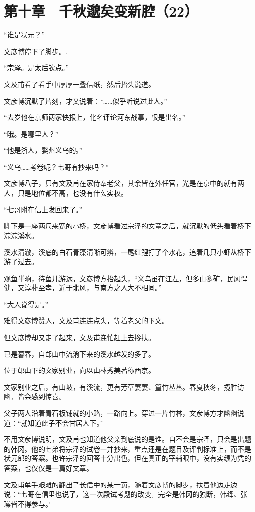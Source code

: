 \section{第十章　千秋邈矣变新腔（22）}

“谁是状元？”

文彦博停下了脚步。.

“宗泽。是太后钦点。”

文及甫看了看手中厚厚一叠信纸，然后抬头说道。

文彦博沉默了片刻，才又说着：“……似乎听说过此人。”

“去岁他在京师两家快报上，化名评论河东战事，很是出名。”

“哦。是哪里人？”

“他是浙人，婺州义乌的。”

“义乌……考卷呢？七哥有抄来吗？”

文彦博八子，只有文及甫在家侍奉老父，其余皆在外任官，光是在京中的就有两人，只是地位都不高，也没有什么实权。

“七哥附在信上发回来了。”

脚下是一座两尺来宽的小桥，文彦博看过宗泽的文章之后，就沉默的低头看着桥下淙淙溪水。

溪水清澈，溪底的白石青藻清晰可辨，一尾红鲤打了个水花，追着几只小虾从桥下游了过去。

观鱼半晌，待鱼儿游远，文彦博方抬起头，“义乌虽在江左，但多山多矿，民风悍健，又淳朴至孝，近于北风，与南方之人大不相同。”

“大人说得是。”

难得文彦博赞人，文及甫连连点头，等着老父的下文。

但文彦博却又走了起来，文及甫连忙赶上去搀扶。

已是暮春，自邙山中流淌下来的溪水越发的多了。

位于邙山下的文家别业，向以山林秀美著称西京。

文家别业之后，有山坡，有溪流，更有芳草萋萋、篁竹丛丛。春夏秋冬，揽胜访幽，皆会感到惊喜。

父子两人沿着青石板铺就的小路，一路向上。穿过一片竹林，文彦博方才幽幽说道：“就知道此子不会甘居人下。”

不用文彦博说明，文及甫也知道他父亲到底说的是谁。自不会是宗泽，只会是出题的韩冈。他的七弟将宗泽的试卷一并抄来，重点还是在题目及评判标准上，而不是状元郎的答案。也许宗泽的回答十分出色，但在真正的宰辅眼中，没有实绩为凭的答案，也仅仅是一篇好文章。

文及甫单手艰难的翻出了长信中的某一页，随着文彦博的脚步，扶着他边走边说：“七哥在信里也说了，这一次殿试考题的改变，完全是韩冈的独断，韩绛、张璪皆不得参与。”

